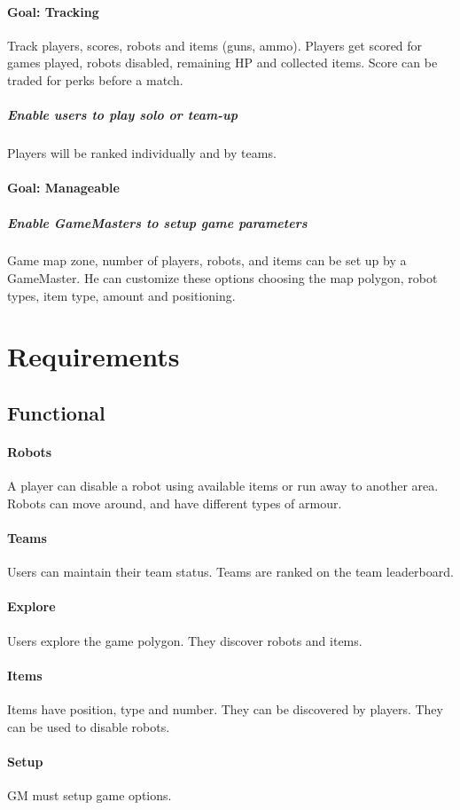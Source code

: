 \documentclass{article}
\begin{document}
\paragraph{\textbf{Goal}: Tracking}
Track players, scores, robots and items (guns, ammo). Players get scored for games played, robots disabled, remaining HP and collected items. Score can be traded for perks before a match. 
\subparagraph{Enable users to play solo or team-up}
Players will be ranked individually and by teams.
\paragraph{\textbf{Goal}: Manageable}
\subparagraph{Enable GameMasters to setup game parameters}
Game map zone, number of players, robots, and items can be set up by a GameMaster. He can customize these options choosing the map polygon, robot types, item type, amount and positioning.
\section{Requirements}
\subsection{Functional}
\paragraph{Robots}
A player can disable a robot using available items or run away to another area. Robots can move around, and have different types of armour.
\paragraph{Teams}
Users can maintain their team status. Teams are ranked on the team leaderboard.
\paragraph{Explore}
Users explore the game polygon. They discover robots and items.
\paragraph{Items}
Items have position, type and number. They can be discovered by players. They can be used to disable robots.
\paragraph{Setup}
GM must setup game options.
\end{document}
